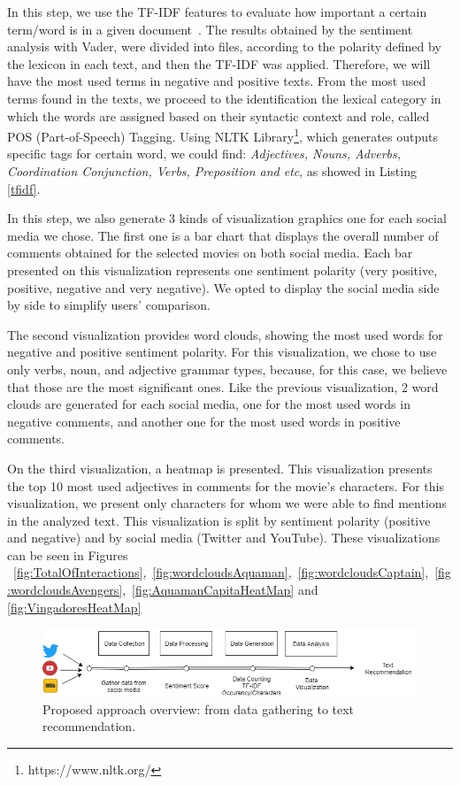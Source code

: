 In this step, we use the TF-IDF features to evaluate how important a certain term/word is in a given document~\cite{Dipanjan:2016}. The results obtained by the sentiment analysis with Vader, were divided into files, according to the polarity defined by the lexicon in each text, and then the TF-IDF was applied. Therefore, we will have the most used terms in negative and positive texts. From the most used terms found in the texts, we proceed to the identification the lexical category in which the words are assigned based on their syntactic context and role, called POS (Part-of-Speech) Tagging. Using NLTK Library\footnote{https://www.nltk.org/}, which generates outputs specific tags for certain word, we could find: \textit{Adjectives, Nouns, Adverbs, Coordination Conjunction, Verbs, Preposition and etc}, as showed in Listing \ref{tfidf}.

In this step, we also generate 3 kinds of visualization graphics one for each social media we chose. The first one is a bar chart that displays the overall number of comments obtained for the selected movies on both social media. Each bar presented on this visualization represents one sentiment polarity (very positive, positive, negative and very negative). We opted to display the social media side by side to simplify users' comparison. 

The second visualization provides word clouds, showing the most used words for negative and positive sentiment polarity. For this visualization, we chose to use only verbs, noun, and adjective grammar types, because, for this case, we believe that those are the most significant ones. Like the previous visualization, 2 word clouds are generated for each social media, one for the most used words in negative comments, and another one for the most used words in positive comments. 

On the third visualization, a heatmap is presented. This visualization presents the top 10 most used adjectives in comments for the movie's characters. For this visualization, we present only characters for whom we were able to find mentions in the analyzed text. This visualization is split by sentiment polarity (positive and negative) and by social media (Twitter and YouTube). These visualizations can be seen in Figures ~\ref{fig:TotalOfInteractions},~\ref{fig:wordcloudsAquaman},~\ref{fig:wordcloudsCaptain},~\ref{fig:wordcloudsAvengers},~\ref{fig:AquamanCapitaHeatMap} and \ref{fig:VingadoresHeatMap}

\begin{figure}[t!]
\begin{center}
\includegraphics[width=0.8\linewidth]{img/Lexicon.png}
\end{center}
   \caption{Proposed approach overview: from data gathering to text recommendation.}
\label{fig:approach}
\end{figure}


